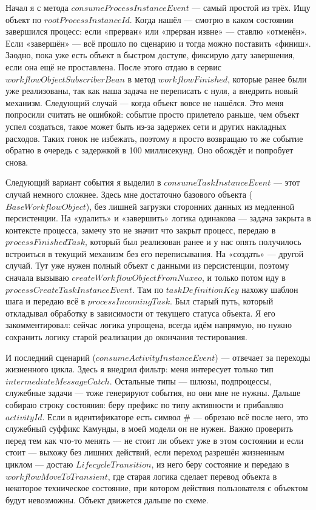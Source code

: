 Начал я с метода $consumeProcessInstanceEvent$ — самый простой из трёх. Ищу объект по             
$rootProcessInstanceId$. Когда нашёл — смотрю в каком состоянии завершился      
процесс: если «прерван» или «прерван извне» — ставлю «отменён». Если «завершён»
— всё прошло по сценарию и тогда можно поставить «финиш». 
Заодно, пока уже есть объект в быстром доступе, фиксирую дату завершения, если она ещё не проставлена.
После этого отдаю в сервис $workflowObjectSubscriberBean$ в метод $workflowFinished$,
которые ранее были уже реализованы, так как наша задача не переписать с нуля, а внедрить новый механизм.                                                                         
Следующий случай — когда объект вовсе не нашёлся. Это меня попросили считать не ошибкой: событие просто
прилетело раньше, чем объект успел создаться, такое может быть из-за задержек сети и других накладных расходов.
Таких гонок не избежать, поэтому я просто возвращаю то же событие обратно в очередь с задержкой в 100
миллисекунд. Оно обождёт и попробует снова. 

Следующий вариант события я выделил в $consumeTaskInstanceEvent$ — этот случай немного сложнее.
Здесь мне достаточно базового объекта ($BaseWorkflowObject$), без лишней загрузки сторонних данных из медленной персистенции.
На «удалить» и «завершить» логика одинакова — задача закрыта в контексте процесса, замечу это не значит что закрыт процесс, передаю в $processFinishedTask$, 
который был реализован ранее и у нас опять получилось встроиться в текущий механизм без его переписывания.
На «создать» — другой случай. Тут уже нужен полный объект с данными из персистенции, поэтому сначала вызываю $createWorkflowObjectFromNuxeo$, и только потом иду в   
$processCreateTaskInstanceEvent$. Там по $taskDefinitionKey$ нахожу шаблон шага и передаю всё в $processIncomingTask$.                                             
Был старый путь, который откладывал обработку в зависимости от текущего статуса объекта. Я его закомментировал: сейчас логика упрощена, всегда идём напрямую, но нужно сохранить логику старой реализации до окончания тестирования.

И последний сценарий ($consumeActivityInstanceEvent$) — отвечает за переходы жизненного цикла. 
Здесь я внедрил фильтр: меня интересует только тип $intermediateMessageCatch$. Остальные 
типы — шлюзы, подпроцессы, служебные задачи — тоже генерируют события, но они мне не нужны.
Дальше собираю строку состояния: беру префикс по типу активности и прибавляю $activityId$. 
Если в идентификаторе есть символ \# — обрезаю всё после него, это служебный суффикс Камунды, в моей модели он не нужен.                                                                               
Важно проверить перед тем как что-то менять — не стоит ли объект уже в этом состоянии и если стоит — выхожу без лишних действий, если переход разрешён
жизненным циклом — достаю $LifecycleTransition$, из него беру состояние и передаю в $workflowMoveToTransient$, 
где старая логика сделает перевод объекта в некоторое техническое состояние,
при котором действия пользователя с объектом будут невозможны. Объект движется дальше по схеме.

